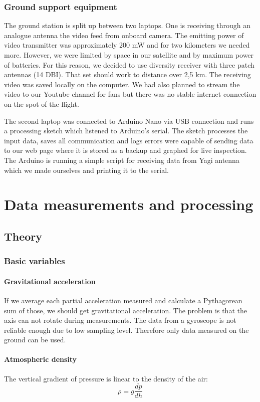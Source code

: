 \documentclass{cfp}
\begin{document}
\subsubsection{Ground support equipment}
\par The ground station is split up between two laptops. One is receiving through an analogue antenna the video feed from onboard camera. The emitting power of video transmitter was approximately 200 mW and for two kilometers we needed more. However, we were limited by space in our satellite and by maximum power of batteries. For this reason, we decided to use diversity receiver with three patch antennas (14 DBI). That set should work to distance over 2,5 km. The receiving video was saved locally on the computer. We had also planned to stream the video to our Youtube channel for fans but there was no stable internet connection on the spot of the flight. 
\par The second laptop was connected to Arduino Nano via USB connection and runs a processing sketch which listened to Arduino’s serial. The sketch processes the input data, saves all communication and logs errors were capable of sending data to our web page where it is stored as a backup and graphed for live inspection. The Arduino is running a simple script for receiving data from Yagi antenna which we made ourselves and printing it to the serial.
\section{Data measurements and processing}
\subsection{Theory}
\subsubsection{Basic variables}
\paragraph{Gravitational acceleration}If we average each partial acceleration measured and calculate a Pythagorean sum of those, we should get gravitational acceleration. The problem is that the axis can not rotate during measurements. The data from a gyroscope is not reliable enough due to low sampling level. Therefore only data measured on the ground can be used.
\paragraph{Atmospheric density} The vertical gradient of pressure is linear to the density of the air:\\
\begin{equation}
    \rho = g \frac{dp}{dh}
\end{equation}
\end{document}
